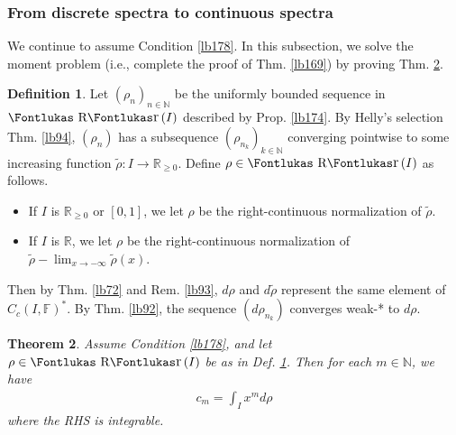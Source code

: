 \documentclass[12pt,b5paper,notitlepage]{article}
\theoremstyle{definition}
\newtheorem{df}{Definition}[subsection]
\theoremstyle{plain}
\newtheorem{thm}[df]{Theorem}
\DeclareMathOperator{\Rr}{\text{\Fontlukas R}\text{\kern -0pt {\Fontlukas\large r}}\,}
\newcommand{\wtd}{\widetilde}
\newcommand{\Nbb}{\mathbb N}
\newcommand{\Rbb}{\mathbb R}
\newcommand{\Fbb}{\mathbb F}
\numberwithin{equation}{section}
\begin{document}
\subsubsection{From discrete spectra to continuous spectra}\label{lb205}


We continue to assume Condition \ref{lb178}. In this subsection, we solve the moment problem (i.e., complete the proof of Thm. \ref{lb169}) by proving Thm. \ref{lb177}.


\begin{df}\label{lb175}
Let $(\rho_n)_{n\in\Nbb}$ be the uniformly bounded sequence in $\Rr(I)$ described by Prop. \ref{lb174}. By Helly's selection Thm. \ref{lb94}, $(\rho_n)$ has a subsequence $(\rho_{n_k})_{k\in\Nbb}$ converging pointwise to some increasing function $\wtd\rho:I\rightarrow\Rbb_{\geq0}$. Define $\rho\in\Rr(I)$ as follows.
\begin{itemize}
\item If $I$ is $\Rbb_{\geq0}$ or $[0,1]$, we let $\rho$ be the right-continuous normalization of $\wtd\rho$.
\item If $I$ is $\Rbb$, we let $\rho$ be the right-continuous normalization of $\wtd\rho-\lim_{x\rightarrow-\infty}\wtd\rho(x)$.
\end{itemize}
Then by Thm. \ref{lb72} and Rem. \ref{lb93}, $d\rho$ and $d\wtd\rho$ represent the same element of $C_c(I,\Fbb)^*$. By Thm. \ref{lb92}, the sequence $(d\rho_{n_k})$ converges weak-* to $d\rho$.
\end{df}


\begin{thm}\label{lb177}
Assume Condition \ref{lb178}, and let $\rho\in\Rr(I)$ be as in Def. \ref{lb175}. Then for each $m\in\Nbb$, we have
\begin{align*}
c_m=\int_I x^md\rho
\end{align*}
where the RHS is integrable.
\end{thm}
\end{document}
